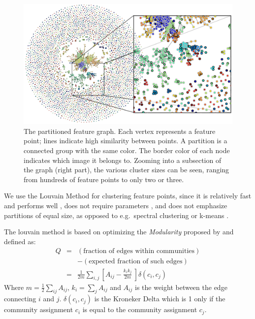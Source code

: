 \begin{figure}[t]
    \centering
	\includegraphics[width=\textwidth]{images/MMC_graph}
    \caption{The partitioned feature graph. Each vertex represents a 
        feature point; lines indicate high similarity between points. A 
        partition is a connected group with the same color. The border 
        color of each node indicates which image it belongs to.  Zooming 
    into a subsection of the graph (right part), the various cluster 
sizes can be seen, ranging from hundreds of feature points to only two 
or three.}
    \label{fig:graph-view}
\end{figure}

We use the Louvain Method \cite{blondel2008} for clustering feature 
points, since it is relatively fast and performs well 
\cite{lancichinetti2009}, does not require parameters 
\cite{blondel2008}, and does not emphasize partitions of equal size, as 
opposed to e.g.\ spectral clustering or k-means \cite{von2007}.

The louvain method is based on optimizing the \emph{Modularity} proposed 
by \cite{girvan2002} and defined as:
\begin{eqnarray*}
	Q & = & (\mbox{fraction of edges within communities}) \\
	  & & - (\mbox{expected fraction of such edges}) \\
	& = & \frac{1}{2m} \sum_{i,j} \left[ A_{ij} - \frac{k_i k_j}{2m} \
\right] \delta(c_i, c_j)
\end{eqnarray*}
Where $m=\frac{1}{2} \sum_{ij} A_{ij}$, $k_i = \sum_j A_{ij}$ and 
$A_{ij}$ is the weight between the edge connecting $i$ and $j$.  
$\delta(c_i, c_j)$ is the Kroneker Delta which is 1 only if the 
community assignment $c_i$ is equal to the community assignment $c_j$.

